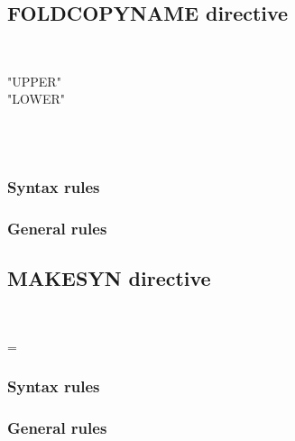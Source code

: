 \subsection{FOLDCOPYNAME directive}

\begin{syntax}[\miscextcolour]
  \begin{1=}
     \\
  \end{1=}
  \begin{1=}
    "UPPER" \\
    "LOWER"
  \end{1=} 
\end{syntax}

\begin{syntax}[\miscextcolour]
  \begin{1=}
     \\
     \\
  \end{1=}
\end{syntax}

\subsubsection{Syntax rules}

\subsubsection{General rules}

\subsection{MAKESYN directive}

\begin{syntax}[\miscextcolour]
  \begin{1=}
     \\
  \end{1=}
  \literal = \literal
\end{syntax}

\subsubsection{Syntax rules}

\subsubsection{General rules}

